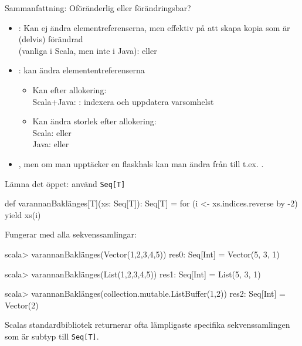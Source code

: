 \begin{Slide}{Sammanfattning: Oföränderlig eller förändringsbar?}
\begin{itemize}
\item {}:  Kan ej ändra elementreferenserna, men effektiv på att skapa kopia som är (delvis) förändrad\\(vanliga i Scala, men inte i Java):  eller 

\item {}: kan ändra elemententreferenserna
  \begin{itemize}
  \item Kan  efter allokering: \\ Scala+Java: : indexera och uppdatera varsomhelst
  \item Kan ändra storlek efter allokering:
  \\ Scala:  eller 
  \\ Java:  eller 
  \end{itemize}
\item {}, men om man  upptäcker en flaskhals kan man ändra från  till t.ex. .
\end{itemize}
\end{Slide}





\begin{Slide}{Lämna det öppet: använd \texttt{Seq[T]}}
\begin{Code}[basicstyle=\ttfamily]
def varannanBaklänges[T](xs: Seq[T]): Seq[T] =
  for (i <- xs.indices.reverse by -2) yield xs(i)
\end{Code}
Fungerar med alla sekvenssamlingar:
\begin{REPLnonum}
scala> varannanBaklänges(Vector(1,2,3,4,5))
res0: Seq[Int] = Vector(5, 3, 1)

scala> varannanBaklänges(List(1,2,3,4,5))
res1: Seq[Int] = List(5, 3, 1)

scala> varannanBaklänges(collection.mutable.ListBuffer(1,2))
res2: Seq[Int] = Vector(2)
\end{REPLnonum}
Scalas standardbibliotek returnerar ofta lämpligaste specifika sekvenssamlingen som är subtyp till \texttt{Seq[T]}.
\end{Slide}



